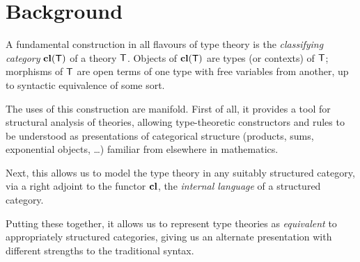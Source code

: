 
\section{Background}

\begin{para}
A fundamental construction in all flavours of type theory is the \emph{classifying category} $\mathbf{cl}(\mathsf{T})$ of a theory $\mathsf{T}$.  Objects of $\mathbf{cl}(\mathsf{T})$ are types (or contexts) of $\mathsf{T}$; morphisms of $\mathsf{T}$ are open terms of one type  with free variables from another, up to syntactic equivalence of some sort.

The uses of this construction are manifold.  First of all, it provides a tool for structural analysis of theories, allowing type-theoretic constructors and rules to be understood as presentations of categorical structure (products, sums, exponential objects, \ldots) familiar from elsewhere in mathematics.

Next, this allows us to model the type theory in any suitably structured category, via a right adjoint to the functor $\mathbf{cl}$, the \emph{internal language} of a structured category.

Putting these together, it allows us to represent type theories as \emph{equivalent} to appropriately structured categories, giving us an alternate presentation with different strengths to the traditional syntax.
\end{para}

